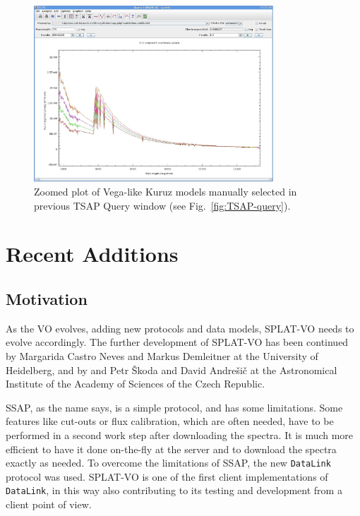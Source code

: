 \documentclass[final,authoryear,5p,times,twocolumn]{elsarticle}
\begin{document}
\begin{figure}[t]
\begin{center}
\includegraphics[width=0.8\textwidth]{TSSA-plot.pdf}
\caption{Zoomed plot of Vega-like Kuruz models manually selected in previous
TSAP Query window (see Fig.~\ref{fig:TSAP-query}). }
\label{fig:TSAP-plot}
\end{center}
\end{figure}



\section{Recent Additions}


\subsection{Motivation}

As the VO evolves, adding new protocols and data models, SPLAT-VO
needs to evolve accordingly.  The further development of SPLAT-VO has
been continued by Margarida Castro Neves and Markus Demleitner at the
University of Heidelberg, and by and Petr \v{S}koda and David Andre\v{s}i\v{c} at
the Astronomical Institute of the Academy of Sciences of the Czech
Republic.

SSAP, as the name says, is a simple protocol, and has some limitations. Some
features like cut-outs or flux calibration, which are often needed, have to be
performed in a second work step after downloading the spectra. It is much more
efficient to have it done on-the-fly at the server and  to download the
spectra exactly as needed. To overcome the limitations of SSAP, the new
\texttt{DataLink} protocol \citep{datalink} was used. SPLAT-VO is one of the first
client implementations of \texttt{DataLink}, in this way also contributing to its
testing and development from a client point of view.
\end{document}

